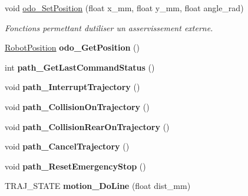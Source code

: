 \begin{DoxyCompactItemize}
\item 
\mbox{\label{classAsservDriver_a5806e26618e1b2a4590b67ba55a55165}} 
void \hyperlink{classAsservDriver_a5806e26618e1b2a4590b67ba55a55165}{odo\+\_\+\+Set\+Position} (float x\+\_\+mm, float y\+\_\+mm, float angle\+\_\+rad)
\begin{DoxyCompactList}\small\item\em Fonctions permettant d\textquotesingle{}utiliser un asservissement externe. \end{DoxyCompactList}\item 
\mbox{\label{classAsservDriver_a0a62fbec28bfc5510eb75b6ad434baed}} 
\hyperlink{structRobotPosition}{Robot\+Position} {\bfseries odo\+\_\+\+Get\+Position} ()
\item 
\mbox{\label{classAsservDriver_ac4b8627777e76c145265a8e988852484}} 
int {\bfseries path\+\_\+\+Get\+Last\+Command\+Status} ()
\item 
\mbox{\label{classAsservDriver_affc4e315cdd03c826cea17114d02a19c}} 
void {\bfseries path\+\_\+\+Interrupt\+Trajectory} ()
\item 
\mbox{\label{classAsservDriver_a6af616f39706df060f1b81b2047c7a7f}} 
void {\bfseries path\+\_\+\+Collision\+On\+Trajectory} ()
\item 
\mbox{\label{classAsservDriver_a370b2f287b352211c07a023edcb63bc7}} 
void {\bfseries path\+\_\+\+Collision\+Rear\+On\+Trajectory} ()
\item 
\mbox{\label{classAsservDriver_a7f18af77a8524e09f8c9b024d4f0e4b8}} 
void {\bfseries path\+\_\+\+Cancel\+Trajectory} ()
\item 
\mbox{\label{classAsservDriver_aa54769b7bbe83fefa64925aa60089096}} 
void {\bfseries path\+\_\+\+Reset\+Emergency\+Stop} ()
\item 
\mbox{\label{classAsservDriver_a1b4a90efa1f4416161944d9b164be2bc}} 
T\+R\+A\+J\+\_\+\+S\+T\+A\+TE {\bfseries motion\+\_\+\+Do\+Line} (float dist\+\_\+mm)
\item 
\mbox{\label{classAsservDriver_af7b023caadc3314c7640c98378829636}} 

\end{DoxyCompactItemize}
